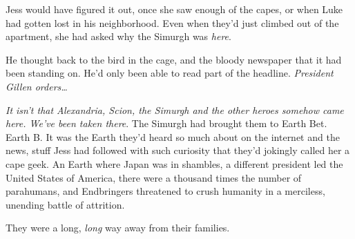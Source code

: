 Jess would have figured it out, once she saw enough of the capes, or when Luke had gotten lost in his neighborhood.  Even when they'd just climbed out of the apartment, she had asked why the Simurgh was \emph{here}.



He thought back to the bird in the cage, and the bloody newspaper that it had been standing on.  He'd only been able to read part of the headline.  \emph{President Gillen orders\ldots}



\emph{It isn't that Alexandria, Scion, the Simurgh and the other heroes somehow came here.  We've been taken there}.  The Simurgh had brought them to Earth Bet.  Earth B.  It was the Earth they'd heard so much about on the internet and the news, stuff Jess had followed with such curiosity that they'd jokingly called her a cape geek.  An Earth where Japan was in shambles, a different president led the United States of America, there were a thousand times the number of parahumans, and Endbringers threatened to crush humanity in a merciless, unending battle of attrition.



They were a long, \emph{long} way away from their families.





